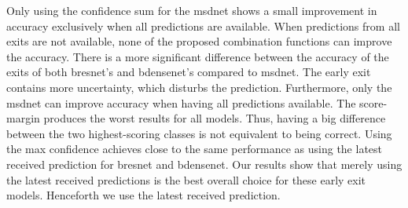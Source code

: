 Only using the confidence sum for the \gls{msdnet} shows a small improvement in accuracy exclusively when all predictions are available. When predictions from all exits are not available, none of the proposed combination functions can improve the accuracy. There is a more significant difference between the accuracy of the exits of both \gls{bresnet}'s and \gls{bdensenet}'s compared to \gls{msdnet}. The early exit contains more uncertainty, which disturbs the prediction. Furthermore, only the \gls{msdnet} can improve accuracy when having all predictions available.
The score-margin produces the worst results for all models. Thus, having a big difference between the two highest-scoring classes is not equivalent to being correct. Using the  max confidence achieves close to the same performance as using the latest received prediction for \gls{bresnet} and \gls{bdensenet}. Our results show that merely using the latest received predictions is the best overall choice for these early exit models. Henceforth we use the latest received prediction.


